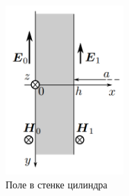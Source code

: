 \documentclass[a4paper,12pt]{article}
\theoremstyle{plain} %
\theoremstyle{definition} %
\theoremstyle{remark} %
\begin{document}
	\begin{figure}
		\includegraphics[width=4.5cm]{wall.png}
		\caption{Поле в стенке цилиндра}
		\label{pic:2}
	\end{figure}
	
\end{document}
